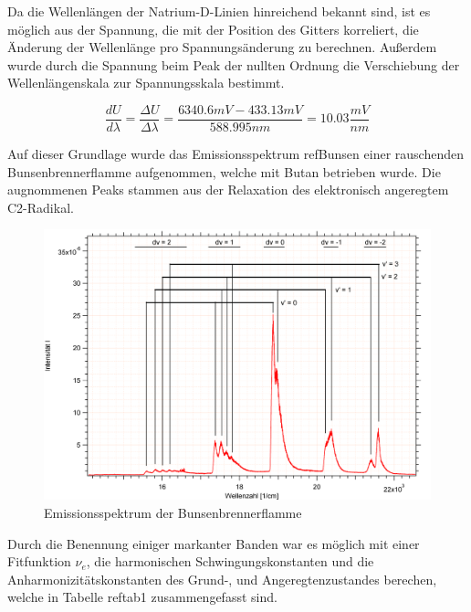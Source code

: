 


Da die Wellenlängen der Natrium-D-Linien hinreichend bekannt sind, ist es möglich aus der Spannung, die mit der Position des Gitters korreliert, die Änderung der Wellenlänge pro Spannungsänderung zu berechnen. Außerdem wurde durch die Spannung beim Peak der nullten Ordnung die Verschiebung der Wellenlängenskala zur Spannungsskala bestimmt.

\begin {equation}
\frac{dU}{d\lambda}=\frac{\Delta U}{\Delta\lambda}=\frac{6340.6 mV - 433.13 mV}{588.995 nm}=10.03 \frac{mV}{nm}
\end {equation}


Auf dieser Grundlage wurde das Emissionsspektrum ref{Bunsen} einer rauschenden Bunsenbrennerflamme aufgenommen, welche mit Butan betrieben wurde. Die augnommenen Peaks stammen aus der Relaxation des elektronisch angeregtem C2-Radikal.



\begin{figure}[H]
	\centering	
	\begin{minipage}{1\textwidth}
	\includegraphics[width=\columnwidth]{Bilder/Graph3.png}
	\end{minipage}
	
	
	\caption{Emissionsspektrum der Bunsenbrennerflamme}
	

	\label{Bunsen}
\end{figure}

Durch die Benennung einiger markanter Banden war es möglich mit einer Fitfunktion $\nu_e$, die harmonischen Schwingungskonstanten und die Anharmonizitätskonstanten des Grund-, und Angeregtenzustandes berechen, welche in Tabelle  ref{tab1} zusammengefasst sind.


